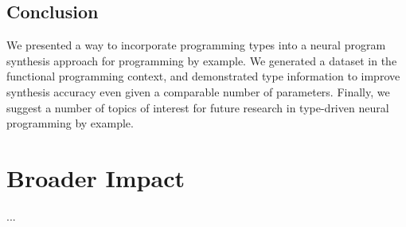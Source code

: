 \documentclass{article} %
\begin{document}

\subsection{Conclusion}

We presented a way to incorporate programming types into a neural program synthesis approach for programming by example.
We generated a dataset in the functional programming context,
and demonstrated type information to improve synthesis accuracy even given a comparable number of parameters.
Finally, we suggest a number of topics of interest for future research in type-driven neural programming by example.


\section*{Broader Impact}

...


% 

% 





\end{document}
